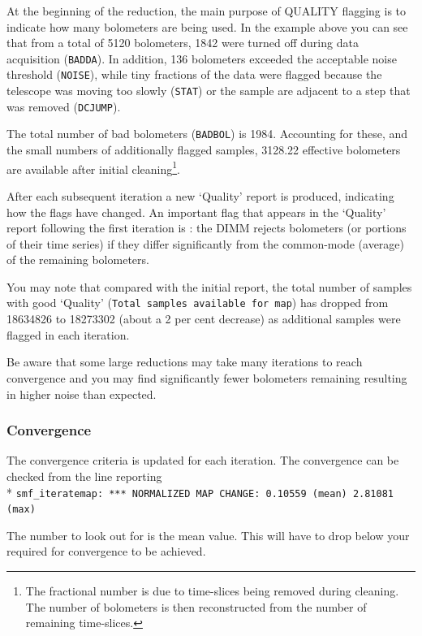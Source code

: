 At the beginning of the reduction, the main purpose of QUALITY
flagging is to indicate how many bolometers are being used. In the
example above you can see that from a total of 5120 bolometers, 1842
were turned off during data acquisition (\texttt{BADDA}). In addition,
136 bolometers exceeded the acceptable noise threshold
(\texttt{NOISE}), while tiny fractions of the data were flagged
because the telescope was moving too slowly (\texttt{STAT}) or the
sample are adjacent to a step that was removed (\texttt{DCJUMP}).

The total number of bad bolometers (\texttt{BADBOL}) is 1984.
Accounting for these, and the small numbers of additionally flagged
samples, 3128.22 effective bolometers are available after initial
cleaning\footnote{The fractional number is due to time-slices being
removed during cleaning. The number of bolometers is then
reconstructed from the number of remaining time-slices.}.


After each subsequent iteration a new `Quality' report is produced,
indicating how the flags have changed. An important flag that appears
in the `Quality' report following the first iteration is :
the DIMM rejects bolometers (or portions of their time series) if they
differ significantly from the common-mode (average) of the remaining
bolometers.

You may note that compared with the initial report, the total number
of samples with good `Quality' (\texttt{Total samples available for
  map}) has dropped from 18634826 to 18273302 (about a 2 per cent
decrease) as additional samples were flagged in each iteration.

Be aware that some large reductions may take many iterations to reach
convergence and you may find significantly fewer bolometers remaining
resulting in higher noise than expected.

\subsubsection*{Convergence}

The convergence criteria  is updated for each
iteration. The convergence can be checked from the line reporting\\*
\hspace*{0.5cm} \texttt{smf\_iteratemap: *** NORMALIZED MAP CHANGE:
  0.10559 (mean) 2.81081 (max)}

The number to look out for is the mean value. This will have to drop
below your required  for convergence to be achieved.

